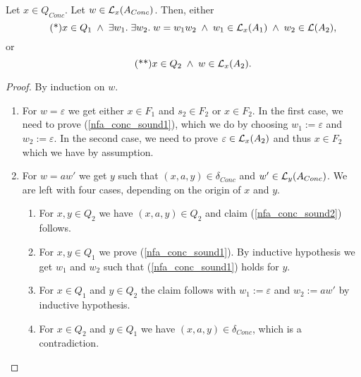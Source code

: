 \begin{lemma}
    \label{nfa_conc_sound}
    Let $x \in Q_{Conc}$. Let $w \in \mathcal{L}_{x}(A_{Conc})$. Then, either
    \begin{equation}
        \tag{*}
        \label{nfa_conc_sound1}
        x \in Q_1 \; \wedge \; \exists w_1. \; \exists w_2. \; w = w_1 w_2 \; \wedge \; w_1 \in \mathcal{L}_{x}(A_1) \; \wedge \; w_2 \in \mathcal{L}(A_2),
    \end{equation}
    or
    \begin{equation}
        \tag{**}
        \label{nfa_conc_sound2}
        x \in Q_2 \; \wedge \; w \in \mathcal{L}_{x}(A_2).
    \end{equation}
\end{lemma}
\begin{proof}
    By induction on $w$. 
    \begin{enumerate}
        \item For $w = \varepsilon$ we get either $x \in F_1$ and $s_2 \in F_2$ or $x \in F_2$.
            In the first case, we need to prove (\ref{nfa_conc_sound1}), which we do by choosing $w_1 := \varepsilon$ and $w_2 := \varepsilon$.
            In the second case, we need to prove $\varepsilon \in \mathcal{L}_{x}(A_2)$ and thus $x \in F_2$ which we have by assumption.
        \item For $w = aw'$ we get $y$ such that $(x,a,y) \in \delta_{Conc}$ and $w' \in \mathcal{L}_{y}(A_{Conc})$. 
            We are left with four cases, depending on the origin of $x$ and $y$.
            \begin{enumerate}
                \item For $x,y \in Q_2$ we have $(x,a,y) \in Q_2$ and claim (\ref{nfa_conc_sound2}) follows.
                \item For $x,y \in Q_1$ we prove (\ref{nfa_conc_sound1}). 
                    By inductive hypothesis we get $w_1$ and $w_2$ such that (\ref{nfa_conc_sound1}) holds for $y$.
                \item For $x \in Q_1$ and $y \in Q_2$ the claim follows with $w_1 := \varepsilon$ and $w_2 := aw'$ by inductive hypothesis.
                \item For $x \in Q_2$ and $y \in Q_1$ we have $(x, a, y) \in \delta_{Conc}$, which is a contradiction.
            \end{enumerate}
    \end{enumerate}
\end{proof}


